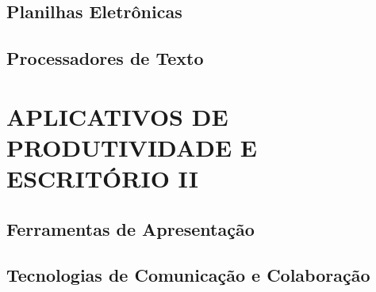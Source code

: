 \documentclass[
]{book}
\begin{document}
\section{Planilhas Eletrônicas}\label{planilhas-eletruxf4nicas}

\section{Processadores de Texto}\label{processadores-de-texto}

\chapter{APLICATIVOS DE PRODUTIVIDADE E ESCRITÓRIO II}\label{aplicativos-de-produtividade-e-escrituxf3rio-ii}

\section{Ferramentas de Apresentação}\label{ferramentas-de-apresentauxe7uxe3o}

\section{Tecnologias de Comunicação e Colaboração}\label{tecnologias-de-comunicauxe7uxe3o-e-colaborauxe7uxe3o}

  
\end{document}
